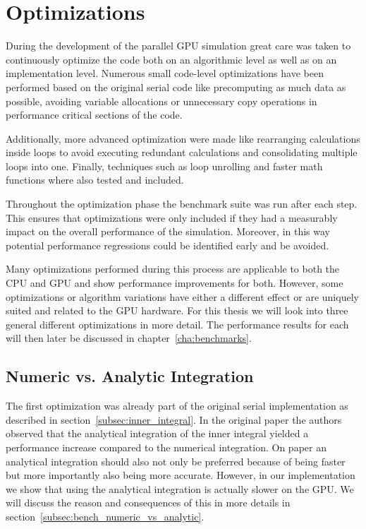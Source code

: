 \documentclass[a4paper,11pt]{kth-mag}
\begin{document}
\section{Optimizations}
\label{sec:serial_optimizations}

During the development of the parallel GPU simulation great care was taken to continuously optimize the code both on an algorithmic level as well as on an implementation level. Numerous small code-level optimizations have been performed based on the original serial code like precomputing as much data as possible, avoiding variable allocations or unnecessary copy operations in performance critical sections of the code.

Additionally, more advanced optimization were made like rearranging calculations inside loops to avoid executing redundant calculations and consolidating multiple loops into one. Finally, techniques such as loop unrolling and faster math functions where also tested and included.

Throughout the optimization phase the benchmark suite was run after each step. This ensures that optimizations were only included if they had a measurably impact on the overall performance of the simulation. Moreover, in this way potential performance regressions could be identified early and be avoided.

Many optimizations performed during this process are applicable to both the CPU and GPU and show performance improvements for both. However, some optimizations or algorithm variations have either a different effect or are uniquely suited and related to the GPU hardware. For this thesis we will look into three general different optimizations in more detail. The performance results for each will then later be discussed in chapter~\ref{cha:benchmarks}.

\subsection{Numeric vs. Analytic Integration}
\label{subsec:numeric_analytic}
The first optimization was already part of the original serial implementation as described in section~\ref{subsec:inner_integral}. In the original paper \cite{} the authors observed that the analytical integration of the inner integral yielded a performance increase compared to the numerical integration. On paper an analytical integration should also not only be preferred because of being faster but more importantly also being more accurate. However, in our implementation we show that using the analytical integration is actually slower on the GPU. We will discuss the reason and consequences of this in more details in section~\ref{subsec:bench_numeric_vs_analytic}.
\end{document}

